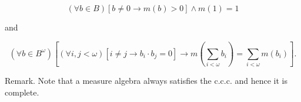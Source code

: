 $$(\forall b \in B) [b \neq 0 \rightarrow m(b) > 0] \wedge m(1) = 1$$

and

$$(\forall b \in B^{\omega}) \left[ (\forall i, j < \omega) [i \neq j \rightarrow b_i \cdot b_j = 0] \rightarrow m \left( \sum_{i < \omega} b_i \right) = \sum_{i < \omega} m(b_i) \right].$$

Remark. Note that a measure algebra always satisfies the c.c.c. and hence it is complete.
